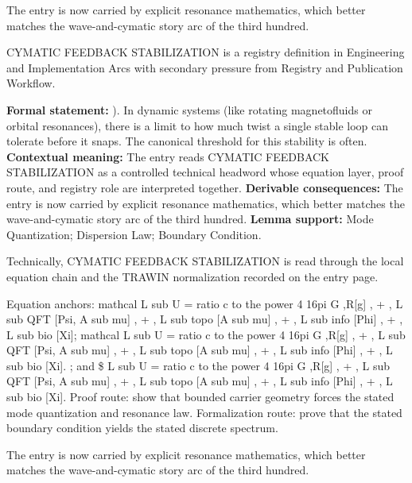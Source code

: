 The entry is now carried by explicit resonance mathematics, which better matches the wave-and-cymatic story arc of the third hundred.
\clearpage


\begingroup\small
{}
CYMATIC FEEDBACK STABILIZATION is a registry definition in Engineering and Implementation Arcs with secondary pressure from Registry and Publication Workflow.

\begingroup\footnotesize\setlength{\emergencystretch}{3em}\sloppy
\textbf{Formal statement:} ). In dynamic systems (like rotating magnetofluids or orbital resonances), there is a limit to how much twist a single stable loop can tolerate before it snaps. The canonical threshold for this stability is often. \textbf{Contextual meaning:} The entry reads CYMATIC FEEDBACK STABILIZATION as a controlled technical headword whose equation layer, proof route, and registry role are interpreted together. \textbf{Derivable consequences:} The entry is now carried by explicit resonance mathematics, which better matches the wave-and-cymatic story arc of the third hundred. \textbf{Lemma support:} Mode Quantization; Dispersion Law; Boundary Condition.\par
\endgroup

Technically, CYMATIC FEEDBACK STABILIZATION is read through the local equation chain and the TRAWIN normalization recorded on the entry page.

Equation anchors: mathcal L sub U = ratio c to the power 4 16pi G ,R[g] , + , L sub QFT [Psi, A sub mu] , + , L sub topo [A sub mu] , + , L sub info [Phi] , + , L sub bio [Xi]; mathcal L sub U = ratio c to the power 4 16pi G ,R[g] , + , L sub QFT [Psi, A sub mu] , + , L sub topo [A sub mu] , + , L sub info [Phi] , + , L sub bio [Xi]. ; and \$ L sub U = ratio c to the power 4 16pi G ,R[g] , + , L sub QFT [Psi, A sub mu] , + , L sub topo [A sub mu] , + , L sub info [Phi] , + , L sub bio [Xi]. Proof route: show that bounded carrier geometry forces the stated mode quantization and resonance law. Formalization route: prove that the stated boundary condition yields the stated discrete spectrum.

The entry is now carried by explicit resonance mathematics, which better matches the wave-and-cymatic story arc of the third hundred.
\endgroup

